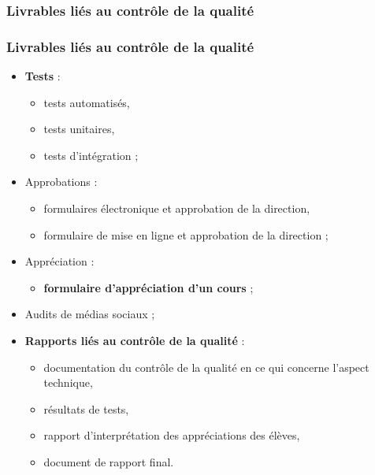 					\subsubsection{Livrables liés au contrôle de la qualité} 
							\begin{frame}[allowframebreaks]
							\frametitle{Livrables liés au contrôle de la qualité}
                        			
							\begin{itemize}
							
							\item \textbf{Tests} : 
								\begin{itemize}
								\item tests automatisés,
								\item tests unitaires,
								\item tests d’intégration ;
								\end{itemize}
							\item Approbations :
								\begin{itemize}
								\item formulaires électronique et approbation de la direction,
								\item formulaire de mise en ligne et approbation de la direction ;
								\end{itemize}
							\item Appréciation : 
								\begin{itemize}
								\item \textbf{formulaire d’appréciation d’un cours} ;
								\end{itemize}
							\framebreak
							\item Audits de médias sociaux ;
							\item \textbf{Rapports liés au contrôle de la qualité} :
								\begin{itemize}
								\item documentation du contrôle de la qualité en ce qui concerne l’aspect technique,
								\item résultats de tests,
								\item rapport d’interprétation des appréciations des élèves,
								\item document de rapport final.
								
								
								\end{itemize}
							\end{itemize}						
					\end{frame}

